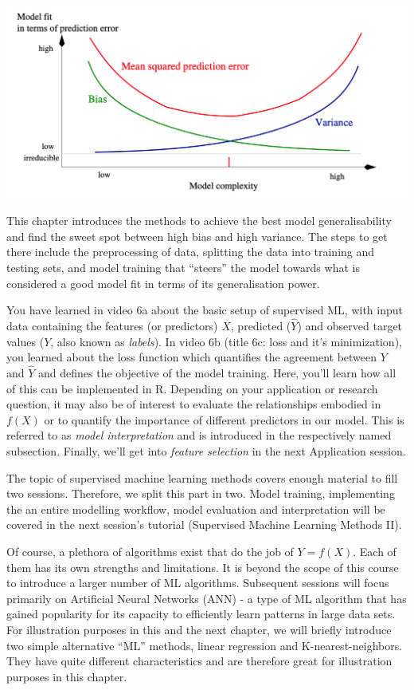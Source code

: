 \documentclass[
]{book}
\begin{document}
\includegraphics{./figures/bias-variance.png}

This chapter introduces the methods to achieve the best model generalisability and find the sweet spot between high bias and high variance. The steps to get there include the preprocessing of data, splitting the data into training and testing sets, and model training that ``steers'' the model towards what is considered a good model fit in terms of its generalisation power.

You have learned in video 6a about the basic setup of supervised ML, with input data containing the features (or predictors) \(X\), predicted (\(\hat{Y}\)) and observed target values (\(Y\), also known as \emph{labels}). In video 6b (title 6c: loss and it's minimization), you learned about the loss function which quantifies the agreement between \(Y\) and \(\hat{Y}\) and defines the objective of the model training. Here, you'll learn how all of this can be implemented in R. Depending on your application or research question, it may also be of interest to evaluate the relationships embodied in \(f(X)\) or to quantify the importance of different predictors in our model. This is referred to as \emph{model interpretation} and is introduced in the respectively named subsection. Finally, we'll get into \emph{feature selection} in the next Application session.

The topic of supervised machine learning methods covers enough material to fill two sessions. Therefore, we split this part in two. Model training, implementing the an entire modelling workflow, model evaluation and interpretation will be covered in the next session's tutorial (Supervised Machine Learning Methods II).

Of course, a plethora of algorithms exist that do the job of \(Y = f(X)\). Each of them has its own strengths and limitations. It is beyond the scope of this course to introduce a larger number of ML algorithms. Subsequent sessions will focus primarily on Artificial Neural Networks (ANN) - a type of ML algorithm that has gained popularity for its capacity to efficiently learn patterns in large data sets. For illustration purposes in this and the next chapter, we will briefly introduce two simple alternative ``ML'' methods, linear regression and K-nearest-neighbors. They have quite different characteristics and are therefore great for illustration purposes in this chapter.
\end{document}

